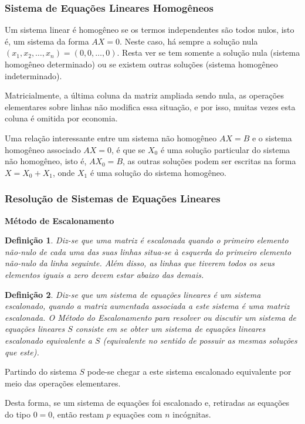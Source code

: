 \documentclass[oneside,a4paper,12pt]{article}
\newtheorem{definition}{Definição}[section]
\begin{document}
\subsubsection{Sistema de Equações Lineares Homogêneos}

Um sistema linear é homogêneo se os termos independentes são todos nulos, isto é, um sistema da forma $AX=0$. Neste caso, há sempre a solução nula $(x_1,x_2,\dots,x_n)=(0,0,\dots,0)$. Resta ver se tem somente a solução nula (sistema homogêneo determinado) ou se existem outras soluções (sistema homogêneo indeterminado).

Matricialmente, a última coluna da matriz ampliada sendo nula, as operações elementares sobre linhas não modifica essa situação, e por isso, muitas vezes esta coluna é omitida por economia.

Uma relação interessante entre um sistema não homogêneo $AX=B$ e o sistema homogêneo associado $AX=0$, é que se $X_0$ é uma solução particular do sistema não homogêneo, isto é, $AX_0=B$, as outras soluções podem ser escritas na forma $X=X_0+X_1$, onde $X_1$ é uma solução do sistema homogêneo.


\subsubsection{Resolução de Sistemas de Equações Lineares}

\textbf{Método de Escalonamento}
\begin{definition}
	Diz-se que uma matriz é escalonada quando o primeiro elemento não-nulo de cada uma das suas linhas situa-se à esquerda do primeiro elemento não-nulo da linha seguinte. Além disso, as linhas que tiverem todos os seus elementos iguais a zero devem estar abaixo das demais.
\end{definition}

\begin{definition}
	Diz-se que um sistema de equações lineares é um sistema escalonado, quando a matriz aumentada associada a este sistema é uma matriz escalonada. O Método do Escalonamento para resolver ou discutir um sistema de equações lineares $S$ consiste em se obter um sistema de equações lineares escalonado equivalente a $S$ (equivalente no sentido de possuir as mesmas soluções que este).
\end{definition}

Partindo do sistema $S$ pode-se chegar a este sistema escalonado equivalente por meio das operações elementares.

Desta forma, se um sistema de equações foi escalonado e, retiradas as equações do tipo $0=0$, então restam $p$ equações com $n$ incógnitas.
\end{document}
